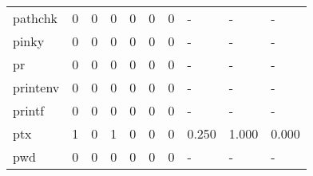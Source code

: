 \begin{longtable}{lp{2.0cm}p{2.0cm}p{2.0cm}p{2.0cm}p{2.0cm}p{2.0cm}p{2.0cm}p{2.0cm}p{2.0cm}}
pathchk   &                      0 &                                             0 &                                            0 &                                           0 &                                            0 &                                          0 &                                    - &                                      - &                                    - \\
pinky     &                      0 &                                             0 &                                            0 &                                           0 &                                            0 &                                          0 &                                    - &                                      - &                                    - \\
pr        &                      0 &                                             0 &                                            0 &                                           0 &                                            0 &                                          0 &                                    - &                                      - &                                    - \\
printenv  &                      0 &                                             0 &                                            0 &                                           0 &                                            0 &                                          0 &                                    - &                                      - &                                    - \\
printf    &                      0 &                                             0 &                                            0 &                                           0 &                                            0 &                                          0 &                                    - &                                      - &                                    - \\
ptx       &                      1 &                                             0 &                                            1 &                                           0 &                                            0 &                                          0 &                                0.250 &                                  1.000 &                                0.000 \\
pwd       &                      0 &                                             0 &                                            0 &                                           0 &                                            0 &                                          0 &                                    - &                                      - &                                    - \\

\end{longtable}
